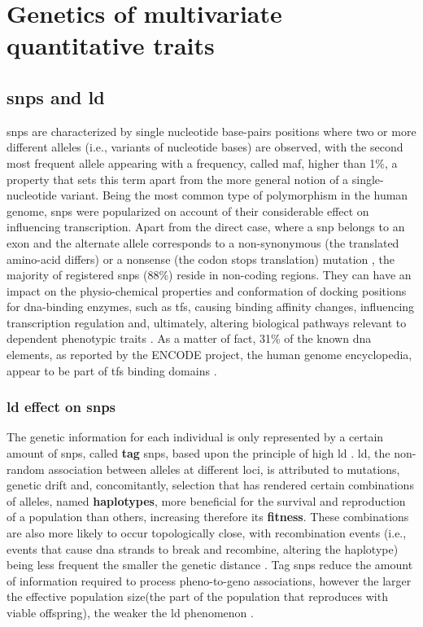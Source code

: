 \section{Genetics of multivariate quantitative traits}


\subsection{\Acfp{snp} and \ac{ld}}
\Acfp{snp} are characterized by single nucleotide base-pairs positions where two or more different alleles (i.e., variants of nucleotide bases) are observed, with the second most frequent allele appearing with a frequency, called \ac{maf}, higher than 1\%, a property that sets this term apart from the more general notion of a single-nucleotide variant. Being the most common type of polymorphism in the human genome, \acp{snp} were popularized on account of their considerable effect on influencing transcription. Apart from the direct case, where a \ac{snp} belongs to an exon and the alternate allele corresponds to a non-synonymous (the translated amino-acid differs) or a nonsense (the codon stops translation) mutation \cite{Ramensky2002}, the majority of registered \acp{snp} (88\%) reside in non-coding regions. They can have an impact on the physio-chemical properties and conformation of docking positions for \ac{dna}-binding enzymes, such as \acp{tf}, causing binding affinity changes, influencing transcription regulation and, ultimately, altering biological pathways relevant to dependent phenotypic traits \cite{Nishizaki2020}. As a matter of fact, 31\% of the known \ac{dna} elements, as reported by the ENCODE project, the human genome encyclopedia, appear to be part of \acp{tf} binding domains \cite{Dunham2012}. 

\subsubsection{\Acf{ld} effect on \acp{snp}}
The genetic information for each individual is only represented by a certain amount of \acp{snp}, called \textbf{tag} \acp{snp}, based upon the principle of high \acf{ld} \cite{Visscher2012, Belmont2003}. \ac{ld}, the non-random association between alleles at different loci, is attributed to mutations, genetic drift and, concomitantly, selection \cite{Visscher2012} that has rendered certain combinations of alleles, named \textbf{haplotypes}, more beneficial for the survival and reproduction of a population than others, increasing therefore its \textbf{fitness}. These combinations are also more likely to occur topologically close, with recombination events (i.e., events that cause \ac{dna} strands to break and recombine, altering the haplotype) being less frequent the smaller the genetic distance \cite{Visscher2012}. Tag \acp{snp} reduce the amount of information required to process pheno-to-geno associations, however the larger the effective population size(the part of the population that reproduces with viable offspring), the weaker the \ac{ld} phenomenon \cite{Visscher2012}.

